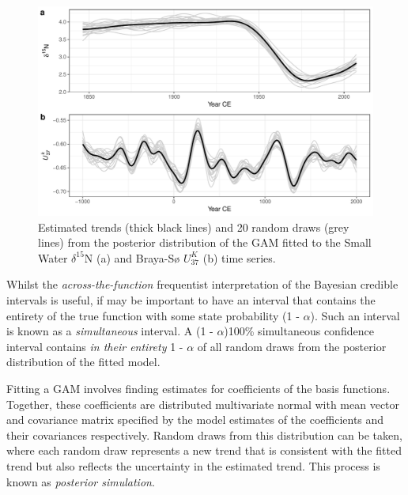\documentclass[12pt,]{article}
\newcommand{\uk}{\ensuremath{\mathit{U}^{\mathit{K}}_{\mathup{37}}}}
\begin{document}
\begin{figure}

{\centering \includegraphics[width=0.8\linewidth]{manuscript_files/figure-latex/posterior-simulation-1} 

}

\caption{Estimated trends (thick black lines) and 20 random draws (grey lines) from the posterior distribution of the GAM fitted to the Small Water $\delta^{15}\text{N}$ (a) and Braya-Sø \uk{} (b) time series.}\label{fig:posterior-simulation}
\end{figure}

Whilst the \emph{across-the-function} frequentist interpretation of the
Bayesian credible intervals is useful, if may be important to have an
interval that contains the entirety of the true function with some state
probability (1 - \(\alpha\)). Such an interval is known as a
\emph{simultaneous} interval. A (1 - \(\alpha\))100\% simultaneous
confidence interval contains \emph{in their entirety} 1 - \(\alpha\) of
all random draws from the posterior distribution of the fitted model.

Fitting a GAM involves finding estimates for coefficients of the basis
functions. Together, these coefficients are distributed multivariate
normal with mean vector and covariance matrix specified by the model
estimates of the coefficients and their covariances respectively. Random
draws from this distribution can be taken, where each random draw
represents a new trend that is consistent with the fitted trend but also
reflects the uncertainty in the estimated trend. This process is known
as \emph{posterior simulation}.
\end{document}
